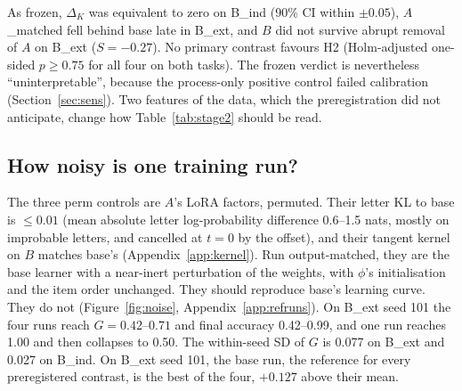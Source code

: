 \documentclass[11pt]{article}
\begin{document}
As frozen, $\Delta_K$ was equivalent to zero on B\_ind (90\% CI within $\pm0.05$), $A$\_matched fell behind base late in B\_ext, and $B$ did not survive abrupt removal of $A$ on B\_ext ($S=-0.27$). No primary contrast favours H2 (Holm-adjusted one-sided $p\ge0.75$ for all four on both tasks). The frozen verdict is nevertheless ``uninterpretable'', because the process-only positive control failed calibration (Section~\ref{sec:sens}). Two features of the data, which the preregistration did not anticipate, change how Table~\ref{tab:stage2} should be read.

\subsection{How noisy is one training run?}\label{sec:noise}

The three perm controls are $A$'s LoRA factors, permuted. Their letter KL to base is $\le0.01$ (mean absolute letter log-probability difference 0.6--1.5 nats, mostly on improbable letters, and cancelled at $t=0$ by the offset), and their tangent kernel on $B$ matches base's (Appendix~\ref{app:kernel}). Run output-matched, they are the base learner with a near-inert perturbation of the weights, with $\phi$'s initialisation and the item order unchanged. They should reproduce base's learning curve. They do not (Figure~\ref{fig:noise}, Appendix~\ref{app:refruns}). On B\_ext seed 101 the four runs reach $G=0.42$--$0.71$ and final accuracy 0.42--0.99, and one run reaches 1.00 and then collapses to 0.50. The within-seed SD of $G$ is 0.077 on B\_ext and 0.027 on B\_ind. On B\_ext seed 101, the base run, the reference for every preregistered contrast, is the best of the four, $+0.127$ above their mean.
\end{document}
